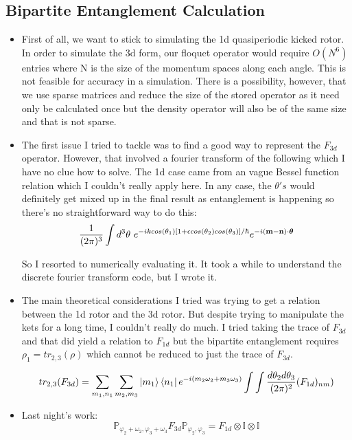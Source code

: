 \documentclass[12pt]{article}
\begin{document}
\subsection{Bipartite Entanglement Calculation}
\begin{itemize}
    \item First of all, we want to stick to simulating the 1d quasiperiodic
    kicked rotor. In order to simulate the 3d form, our floquet operator would
    require $O(N^6)$ entries where N is the size of the momentum spaces along
    each angle. This is not feasible for accuracy in a simulation. There is a
    possibility, however, that we use sparse matrices and reduce the size of
    the stored operator as it need only be calculated once but the density
    operator will also be of the same size and that is not sparse.

    \item The first issue I tried to tackle was to find a good way to represent
    the $F_{3d}$ operator. However, that involved a fourier transform of the
    following which I have no clue how to solve. The 1d case came from an vague
    Bessel function relation which I couldn't really apply here. In any case,
    the $\theta's$ would definitely get mixed up in the final result as
    entanglement is happening so there's no straightforward way to do this:
    \begin{equation}
        \frac{1}{(2\pi)^3} \int d^3\theta \
        e^{-i k cos(\theta_1)[1 + \epsilon cos(\theta_2)  cos(\theta_3)] / \hbar}
        e^{-i (\bf{m - n}) \cdot \boldsymbol{\theta}}
    \end{equation}

    So I resorted to numerically evaluating it. It took a while to understand the
    discrete fourier transform code, but I wrote it.

    \item The main theoretical considerations I tried was trying to get a
    relation between the 1d rotor and the 3d rotor. But despite trying to
    manipulate the kets for a long time, I couldn't really do much. I tried
    taking the trace of $F_{3d}$ and that did yield a relation to $F_{1d}$ but
    the bipartite entanglement requires $\rho_1 = tr_{2,3}(\rho)$ which cannot
    be reduced to just the trace of $F_{3d}$.

    \begin{equation}
        tr_{2,3}(F_{3d}) = \sum_{m_1, n_1} \sum_{m_2, m_3}
        \ket{m_1}\bra{n_1} e^{-i(m_2\omega_2 + m_3\omega_3)}
        \int \int \frac{d\theta_2 d\theta_3}{(2\pi)^2} (F_{1d})_{nm})
    \end{equation}

    \item Last night's work:
    \begin{equation}
        \mathbb{P}_{\varphi_2+\omega_2,\varphi_3+\omega_3}
        F_{3d} \mathbb{P}_{\varphi_2,\varphi_3} = F_{1d}
        \otimes \mathbb{I} \otimes \mathbb{I}
    \end{equation}
\end{itemize}
\end{document}
